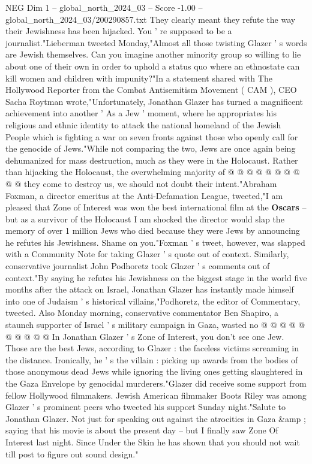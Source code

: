 \begin{textsample}{NEG Dim 1 – global\_north\_2024\_03 – Score -1.00 – global\_north\_2024\_03/200290857.txt}
They clearly meant they refute the way their Jewishness has been hijacked.
You ' re supposed to be a journalist."Lieberman tweeted Monday,"Almost all those twisting Glazer ' s words are Jewish themselves.
Can you imagine another minority group so willing to lie about one of their own in order to uphold a status quo where an ethnostate can kill women and children with impunity?"In a statement shared with The Hollywood Reporter from the Combat Antisemitism Movement ( CAM ), CEO Sacha Roytman wrote,"Unfortunately, Jonathan Glazer has turned a magnificent achievement into another ' As a Jew ' moment, where he appropriates his religious and ethnic identity to attack the national homeland of the Jewish People which is fighting a war on seven fronts against those who openly call for the genocide of Jews."While not comparing the two, Jews are once again being dehumanized for mass destruction, much as they were in the Holocaust.
Rather than hijacking the Holocaust, the overwhelming majority of @ @ @ @ @ @ @ @ @ @ they come to destroy us, we should not doubt their intent."Abraham Foxman, a director emeritus at the Anti-Defamation League, tweeted,"I am pleased that Zone of Interest was won the best international film at the \textbf{Oscars} -- but as a survivor of the Holocaust I am shocked the director would slap the memory of over 1 million Jews who died because they were Jews by announcing he refutes his Jewishness.
Shame on you."Foxman ' s tweet, however, was slapped with a Community Note for taking Glazer ' s quote out of context.
Similarly, conservative journalist John Podhoretz took Glazer ' s comments out of context."By saying he refutes his Jewishness on the biggest stage in the world five months after the attack on Israel, Jonathan Glazer has instantly made himself into one of Judaism ' s historical villains,"Podhoretz, the editor of Commentary, tweeted.
Also Monday morning, conservative commentator Ben Shapiro, a staunch supporter of Israel ' s military campaign in Gaza, wasted no @ @ @ @ @ @ @ @ @ @ In Jonathan Glazer ' s Zone of Interest, you don't see one Jew.
Those are the best Jews, according to Glazer : the faceless victims screaming in the distance.
Ironically, he ' s the villain : picking up awards from the bodies of those anonymous dead Jews while ignoring the living ones getting slaughtered in the Gaza Envelope by genocidal murderers."Glazer did receive some support from fellow Hollywood filmmakers.
Jewish American filmmaker Boots Riley was among Glazer ' s prominent peers who tweeted his support Sunday night."Salute to Jonathan Glazer.
Not just for speaking out against the atrocities in Gaza \&amp ; saying that his movie is about the present day -- but I finally saw Zone Of Interest last night.
Since Under the Skin he has shown that you should not wait till post to figure out sound design."

\end{textsample}

